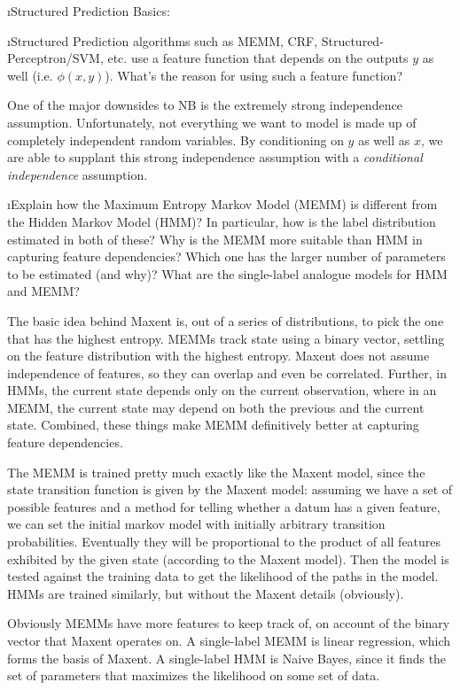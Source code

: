 \documentclass[fleqn]{article}
\begin{document}
\i Structured Prediction Basics: 

\bee

\i Structured Prediction algorithms such as MEMM, CRF, Structured-Perceptron/SVM, 
etc. use a feature function that depends on the outputs $y$ as well (i.e. $\phi(x,y)$).
What's the reason for using such a feature function?

\begin{solution}
One of the major downsides to NB is the extremely strong independence assumption. Unfortunately, not everything we want to model is made up of completely independent random variables. By conditioning on $y$ as well as $x$, we are able to supplant this strong independence assumption with a \textit{conditional independence} assumption.
\end{solution}

\i Explain how the Maximum Entropy Markov Model (MEMM) is different from the 
Hidden Markov Model (HMM)? In particular, how is the label distribution estimated 
in both of these? Why is the MEMM more suitable than HMM in capturing feature 
dependencies? Which one has the larger number of parameters to be estimated (and why)?
What are the single-label analogue models for HMM and MEMM?

\begin{solution}
The basic idea behind Maxent is, out of a series of distributions, to pick the one that has the highest entropy. MEMMs track state using a binary vector, settling on the feature distribution with the highest entropy. Maxent does not assume independence of features, so they can overlap and even be correlated. Further, in HMMs, the current state depends only on the current observation, where in an MEMM, the current state may depend on both the previous and the current state. Combined, these things make MEMM definitively better at capturing feature dependencies. \linebreak

The MEMM is trained pretty much exactly like the Maxent model, since the state transition function is given by the Maxent model: assuming we have a set of possible features and a method for telling whether a datum has a given feature, we can set the initial markov model with initially arbitrary transition probabilities. Eventually they will be proportional to the product of all features exhibited by the given state (according to the Maxent model). Then the model is tested against the training data to get the likelihood of the paths in the model. HMMs are trained similarly, but without the Maxent details (obviously). \linebreak

Obviously MEMMs have more features to keep track of, on account of the binary vector that Maxent operates on. A single-label MEMM is linear regression, which forms the basis of Maxent. A single-label HMM is Naive Bayes, since it finds the set of parameters that maximizes the likelihood on some set of data.
\end{solution}

\ene
\ene
\end{document}
